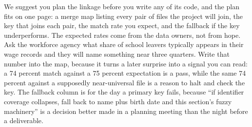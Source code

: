 \documentclass[
    a4paper,
    fontsize=10pt,
    twoside=true,
    numbers=noenddot,
]{kaobook}
\begin{document}
We suggest you plan the linkage before you write any of its code, and the plan fits on one page: a merge map listing every pair of files the project will join, the key that joins each pair, the match rate you expect, and the fallback if the key underperforms. The expected rates come from the data owners, not from hope. Ask the workforce agency what share of school leavers typically appears in their wage records and they will name something near three quarters. Write that number into the map, because it turns a later surprise into a signal you can read: a 74 percent match against a 75 percent expectation is a pass, while the same 74 percent against a supposedly near-universal file is a reason to halt and check the key. The fallback column is for the day a primary key fails, because \enquote{if identifier coverage collapses, fall back to name plus birth date and this section's fuzzy machinery} is a decision better made in a planning meeting than the night before a deliverable.
\end{document}
